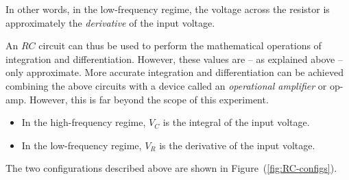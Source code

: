 In other words, in the low-frequency regime, the voltage across the resistor is approximately the \textsl{derivative} of the input voltage.

An $RC$ circuit can thus be used to perform the mathematical operations of integration and differentiation. However, these values are -- as explained above -- only approximate. More accurate integration and differentiation can be achieved combining the above circuits with a device called an \textsl{operational amplifier} or op-amp. However, this is far beyond the scope of this experiment.

\begin{imp}
\begin{itemize}
    \itemsep0em
    \item In the high-frequency regime, $V_C$ is the integral of the input voltage.
    \item In the low-frequency regime,  $V_R$ is the derivative of the input voltage.
\end{itemize}
\end{imp}
The two configurations described above are shown in Figure~(\ref{fig:RC-configs}).


